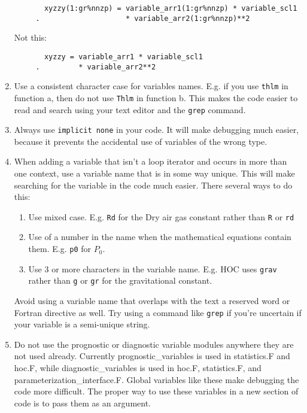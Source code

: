 \documentclass[letterpaper,12pt]{article}
\begin{document}
\begin{enumerate}
\begin{verbatim}
       xyzzy(1:gr%nnzp) = variable_arr1(1:gr%nnzp) * variable_scl1
     .                    * variable_arr2(1:gr%nnzp)**2
\end{verbatim}

Not this:
\begin{verbatim}
       xyzzy = variable_arr1 * variable_scl1 
     .         * variable_arr2**2
\end{verbatim}

\item Use a consistent character case for variables names. 
E.g. if you use \texttt{thlm} in function a, then do not use \texttt{Thlm} in function b. 
This makes the code easier to read and search using your text editor and the 
\texttt{grep} command.
\newline

\item Always use \texttt{implicit none} in your code.  It will make 
debugging much easier, because it prevents the accidental use of 
variables of the wrong type.
\newline

\item When adding a variable that isn't a loop iterator and occurs in more 
than one context, use a variable name that is in some way unique. 
This will make searching for the variable in the code much easier. 
There several ways to do this:
	\begin{enumerate}
	\item Use mixed case.  E.g. \texttt{Rd} for the Dry air gas constant 
	rather than \texttt{R} or \texttt{rd}
	\item Use of a number in the name when the mathematical equations 
	contain them. 
	 E.g. \texttt{p0} for $P_0$.
	\item Use 3 or more characters in the variable name.
	E.g. HOC uses \texttt{grav} 
	rather than \texttt{g} or \texttt{gr} for the gravitational constant.
	\end{enumerate}
Avoid using a variable name that overlaps with the text a reserved word or
Fortran directive as well.
Try using a command
like \texttt{grep} if you're uncertain if your variable is a semi-unique string.
\newline

\item Do not use the prognostic or diagnostic variable modules anywhere they
are not used already.  Currently prognostic\_variables is used in statistics.F
and hoc.F, while diagnostic\_variables is used in hoc.F, statistics.F, and 
parameterization\_interface.F.  Global variables like these make debugging 
the code more difficult.  The proper way to use these variables in a new 
section of code is to pass them as an argument.
\newline


\end{enumerate}
\end{document}
